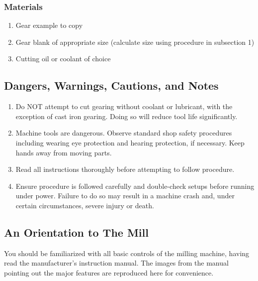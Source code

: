 \documentclass[12pt,twoside,letterpaper]{article}
\begin{document}
\subsubsection{Materials}

\begin{enumerate}
\item Gear example to copy
\item Gear blank of appropriate size (calculate size using procedure in subsection 1)
\item Cutting oil or coolant of choice
\end{enumerate}

\subsection{ Dangers, Warnings, Cautions, and Notes}

\begin{enumerate}
\item Do NOT attempt to cut gearing without coolant or lubricant, with the exception of cast iron gearing. Doing so will reduce tool life significantly. 
\item Machine tools are dangerous. Observe standard shop safety procedures including wearing eye protection and hearing protection, if necessary. Keep hands away from moving parts. 
\item Read all instructions thoroughly before attempting to follow procedure.
\item Ensure procedure is followed carefully and double-check setups before running under power. Failure to do so may result in a machine crash and, under certain circumstances, severe injury or death.
\end{enumerate}




\subsection{An Orientation to The Mill}


You should be familiarized with all basic controls of the milling machine, having read the manufacturer's instruction manual. The images from the manual pointing out the major features are reproduced here for convenience.
\end{document}
